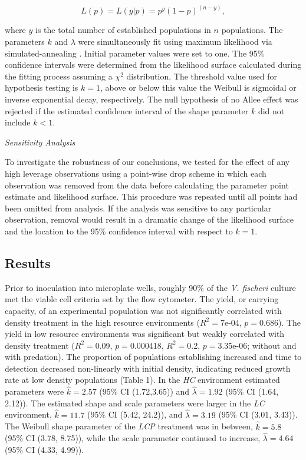 \documentclass[a4paper,10pt]{article}
\begin{document}
\begin{equation}
L(p)= L(y|p)= p^{y} (1-p)^{(n-y)},
\end{equation}

\noindent where $y$ is the total number of established populations in $n$ populations. The parameters $k$ and $\lambda$ were simultaneously fit using maximum likelihood via simulated-annealing \cite{bbmlepack, baseR}. Initial parameter values were set to one.  The 95\% confidence intervals were determined from the likelihood surface calculated during the fitting process assuming a $\chi^{2}$ distribution.  The threshold value used for hypothesis testing is $k=1$, above or below this value the Weibull is sigmoidal or inverse exponential decay, respectively.
 The null hypothesis of no Allee effect was rejected if the estimated confidence interval of the shape parameter $k$ did not include $k<1$.

\textit{Sensitivity Analysis}

To investigate the robustness of our conclusions, we tested for the effect of any high leverage observations using a point-wise drop scheme in which each observation was removed from the data before calculating the parameter point estimate and likelihood surface. This procedure was repeated until all points had been omitted from analysis.  If the analysis was sensitive to any particular observation, removal would result in a dramatic change of the likelihood surface and the location to the 95\% confidence interval with respect to $k=1$. 

\subsection{Results}

Prior to inoculation into microplate wells, roughly 90\% of the \textit{V. fischeri} culture met the viable cell criteria set by the flow cytometer. The yield, or carrying capacity, of an experimental population was not significantly correlated with density treatment in the high resource environments ($R^{2}=$7e-04, $p=$0.686). The yield in low resource environments was significant but weakly correlated with density treatment ($R^{2}=$0.09, $p=$0.000418, $R^{2}=$0.2, $p=$3.35e-06; without and with predation). The proportion of populations establishing increased and time to detection decreased non-linearly with initial density, indicating reduced growth rate at low density populations (Table 1). In the \textit{HC} environment estimated parameters were $\hat k=2.57$ (95\% CI (1.72,3.65)) and $\hat \lambda=1.92$ (95\% CI (1.64, 2.12)). The estimated shape and scale parameters were larger in the \textit{LC} environment, $\hat k=11.7$ (95\% CI (5.42, 24.2)), and $\hat \lambda=3.19$ (95\% CI (3.01, 3.43)). The Weibull shape parameter of the \textit{LCP} treatment was in between, $\hat k=5.8$ (95\% CI (3.78, 8.75)), while the scale parameter continued to increase, $\hat \lambda=4.64$ (95\% CI (4.33, 4.99)). 
\end{document}

